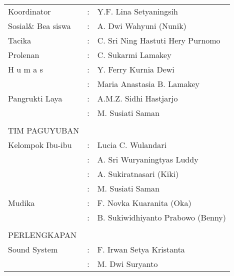 \begin{longtable}{p{5cm}cp{5cm}}
\hspace{0.75cm}Koordinator&:&  Y.F. Lina Setyaningsih\\
\hspace{0.75cm}Sosial\& Bea siswa&:&  A. Dwi Wahyuni (Nunik)\\
\hspace{0.75cm}Tacika &:&  C. Sri Ning Hastuti Hery Purnomo\\
\hspace{0.75cm}Prolenan&:&  C. Sukarmi Lamakey\\
\hspace{0.75cm}H u m a s&:&  Y. Ferry Kurnia Dewi\\
&:&  Maria Anastasia B. Lamakey\\
\hspace{0.75cm}Pangrukti Laya&:&  A.M.Z. Sidhi Hastjarjo\\
&:&  M. Susiati Saman\\
\\
TIM PAGUYUBAN\\
\hspace{0.75cm}Kelompok Ibu-ibu&:&  Lucia C. Wulandari\\
&:&  A. Sri Wuryaningtyas Luddy\\
&:&  A. Sukiratnasari (Kiki)\\
&:&  M. Susiati Saman\\
\hspace{0.75cm}Mudika&:&  F. Novka Kuaranita (Oka)\\
&:&  B. Sukiwidhiyanto Prabowo (Benny)\\
\\
PERLENGKAPAN\\
\hspace{0.75cm}Sound System&:& F. Irwan Setya Kristanta\\
&:& M. Dwi Suryanto\\
\end{longtable}
